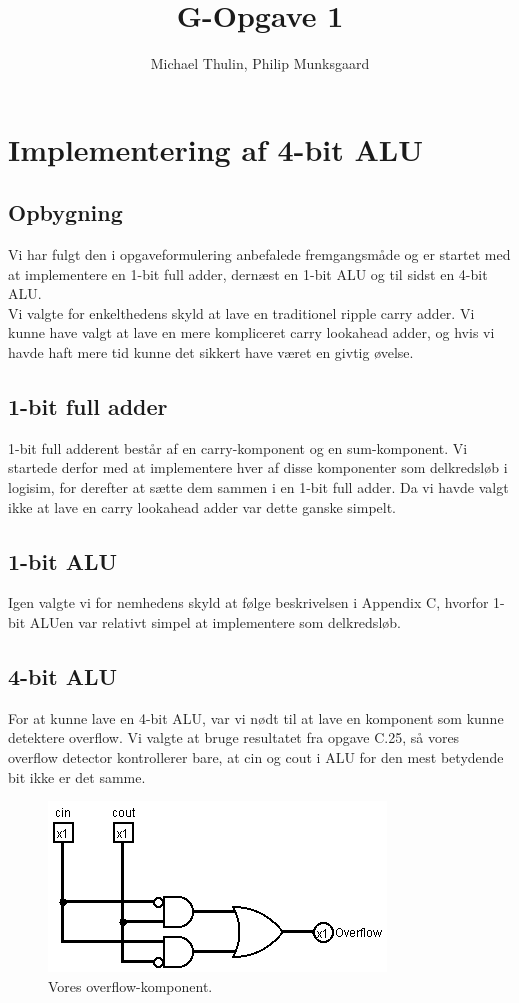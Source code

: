 \documentclass [10pt,a4paper]{article}
\title{G-Opgave 1}
\author{Michael Thulin, Philip Munksgaard}
\begin{document}
\maketitle

\section*{Implementering af 4-bit ALU}
\subsection*{Opbygning}
Vi har fulgt den i opgaveformulering anbefalede fremgangsmåde og er
startet med at implementere en 1-bit full adder, dernæst en 1-bit ALU
og til sidst en 4-bit ALU. \\
Vi valgte for enkelthedens skyld at lave en traditionel ripple carry
adder. Vi kunne have valgt at lave en mere kompliceret carry lookahead
adder, og hvis vi havde haft mere tid kunne det sikkert have været en
givtig øvelse.

\subsection*{1-bit full adder}
1-bit full adderent består af en carry-komponent og en
sum-komponent. Vi startede derfor med at implementere hver af disse
komponenter som delkredsløb i logisim, for derefter at sætte dem
sammen i en 1-bit  full adder. Da vi havde valgt ikke at lave en
carry lookahead adder var dette ganske simpelt.

\subsection*{1-bit ALU}
Igen valgte vi for nemhedens skyld at følge beskrivelsen i Appendix C,
hvorfor 1-bit ALUen var relativt simpel at implementere som
delkredsløb.

\subsection*{4-bit ALU}
For at kunne lave en 4-bit ALU, var vi nødt til at lave en komponent
som kunne detektere overflow. Vi valgte at bruge resultatet fra opgave
C.25, så vores overflow detector kontrollerer bare, at cin og cout i
ALU for den mest betydende bit ikke er det samme. \\

\begin{figure}[h!]
  \centering  
    \includegraphics[scale=0.7]{overflow.png}
  \caption{Vores overflow-komponent.}
\end{figure}
\end{document}
